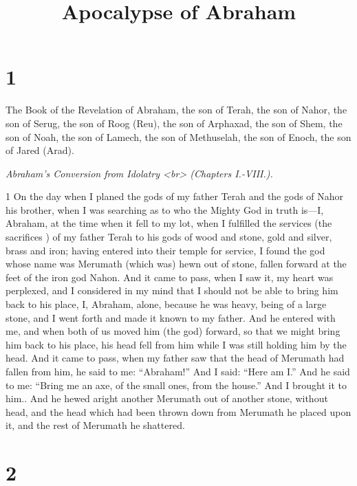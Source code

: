 

\title{Apocalypse of Abraham}

\chapter{1}

\par The Book of the Revelation of Abraham, the son of Terah, the son of Nahor, the son of Serug, the son of Roog (Reu), the son of Arphaxad, the son of Shem, the son of Noah, the son of Lamech, the son of Methuselah, the son of Enoch, the son of Jared (Arad).

\par \textit{Abraham's Conversion from Idolatry <br> (Chapters I.-VIII.).}

\par 1 On the day when I planed the gods of my father Terah and the gods of Nahor his brother, when I was searching as to who the Mighty God in truth is—I, Abraham, at the time when it fell to my lot, when I fulfilled the services (the sacrifices ) of my father Terah to his gods of wood and stone, gold and silver, brass and iron; having entered into their temple for service, I found the god whose name was Merumath (which was) hewn out of stone, fallen forward at the feet of the iron god Nahon. And it came to pass, when I saw it, my heart was perplexed, and I considered in my mind that I should not be able to bring him back to his place, I, Abraham, alone, because he was heavy, being of a large stone, and I went forth and made it known to my father. And he entered with me, and when both of us moved him (the god) forward, so that we might bring him back to his place, his head fell from him while I was still holding him by the head. And it came to pass, when my father saw that the head of Merumath had fallen from him, he said to me: “Abraham!” And I said: “Here am I.” And he said to me: “Bring me an axe, of the small ones, from the house.” And I brought it to him.. And he hewed aright another Merumath out of another stone, without head, and the head which had been thrown down from Merumath he placed upon it, and the rest of Merumath he shattered. 

\chapter{2}

